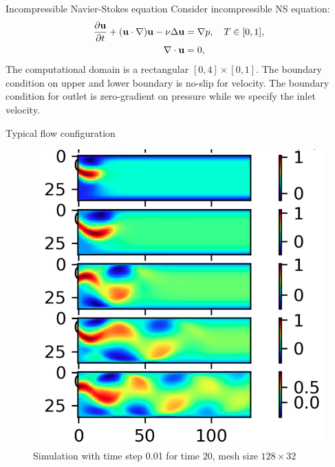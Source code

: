 \documentclass{beamer}
\begin{document}
\begin{frame}{Incompressible Navier-Stokes equation}
	Consider incompressible NS equation:
	\begin{equation}\label{FN}
    \begin{aligned}
        	\frac{\partial \mathbf{u}}{\partial t} + (\mathbf{u} \cdot \nabla)\mathbf{u} -  \nu \Delta \mathbf{u} & =
					\nabla p, \quad T \in [0, 1], 	\\
		\nabla \cdot \mathbf{u} & = 0,
    \end{aligned}
\end{equation}
	The computational domain is a rectangular $[0, 4]\times [0, 1]$. The boundary
	condition on upper and lower boundary is no-slip for velocity. The boundary condition
	for outlet is zero-gradient on pressure while we specify the inlet velocity.
\end{frame}


\begin{frame}{Typical flow configuration}
	\begin{figure}[H]
          \centering
          \centerline{\includegraphics[width=0.6\linewidth]{fig/ns.png}}
          \caption{Simulation with time step 0.01 for time $20$, mesh size $128 \times 32$}
\end{figure}
\end{frame}
\end{document}
